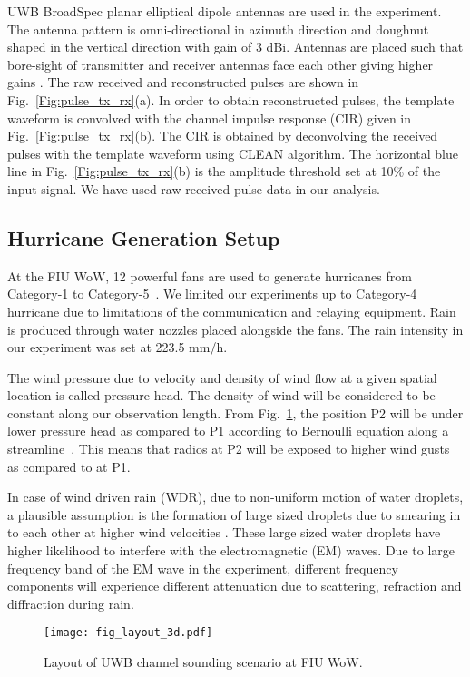 \documentclass[conference]{IEEEtran}
\begin{document}
UWB BroadSpec planar elliptical dipole antennas are used in the experiment. The antenna pattern is omni-directional in azimuth direction and doughnut shaped in the vertical direction with gain of 3 dBi. Antennas are placed such that bore-sight of transmitter and receiver antennas face each other giving higher gains \cite{TD}.  The raw received and reconstructed pulses are shown in Fig.~\ref{Fig:pulse_tx_rx}(a). In order to obtain reconstructed pulses, the template waveform is convolved with the channel impulse response (CIR) given in Fig.~\ref{Fig:pulse_tx_rx}(b). The CIR is obtained by deconvolving the received pulses with the template waveform using CLEAN algorithm. The horizontal blue line in Fig.~\ref{Fig:pulse_tx_rx}(b) is the amplitude threshold set at 10\% of the input signal. We have used raw received pulse data in our analysis. 
\subsection{Hurricane Generation Setup}
At the FIU WoW, 12 powerful fans are used to generate hurricanes from Category-1 to Category-5~\cite{SaffirSimpson}. We limited our experiments up to Category-4 hurricane due to limitations of the communication and relaying equipment. Rain is produced through water nozzles placed alongside the fans. The rain intensity in our experiment was set at 223.5 mm/h. 

The wind pressure due to velocity and density of wind flow at a given spatial location is called pressure head. The density of wind will be considered to be constant along our observation length. From Fig.~\ref{Fig:Exp_Layout}, the position P2 will be under lower pressure head as compared to P1 according to Bernoulli equation along a streamline~\cite{Bernoullieq}. This means that radios at P2 will be exposed to higher wind gusts as compared to at P1. 

In case of wind driven rain (WDR), due to non-uniform motion of water droplets, a plausible assumption is the formation of large sized droplets due to smearing in to each other at higher wind velocities \cite{drop_velocity}. These large sized water droplets have higher likelihood to interfere with the electromagnetic (EM) waves. Due to large frequency band of the EM wave in the experiment, different frequency components will experience different attenuation due to scattering, refraction and diffraction during rain.
\begin{figure}[!t]
	\centering
	\texttt{[image: fig\_layout\_3d.pdf]}
	\caption{Layout of UWB channel sounding scenario at FIU WoW.}\label{Fig:Exp_Layout}
\end{figure}
\end{document}
